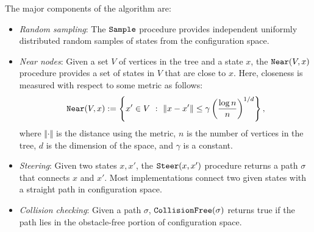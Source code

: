 \documentclass[letterpaper, 10pt, english, conference]{IEEEtran}
\begin{document}
The major components of the algorithm are:
\begin{itemize}
\item {\it Random sampling}:
%
The ${\tt Sample}$ procedure provides independent uniformly distributed random samples of states from the configuration space.

\item {\it Near nodes}:
% 
Given a set $V$ of vertices in the tree and a state $x$, the ${\tt
  Near}(V, x)$ procedure provides a set of states in $V$ that are close to
$x$. Here, closeness is measured with respect to some metric as
follows:
$$
{\tt Near}(V, x) := \left\{ x' \in V \,\,:\,\, \Vert x - x' \Vert \le \gamma
\left(\frac{\log n}{n}\right)^{1/d} \right\},
$$
where $\Vert \cdot \Vert$ is the distance using the metric, $n$ is the number of vertices in the tree, $d$ is the dimension of the space, and $\gamma$ is a constant.
 
\item {\it Steering}:
%
Given two states $x, x'$, the ${\tt Steer}(x,x')$ procedure returns a path $\sigma$ that connects $x$ and $x'$. Most implementations connect two given states with a straight path in configuration space.

\item {\it Collision checking}:
%
Given a path $\sigma$, ${\tt CollisionFree}(\sigma)$ returns true if the path lies in the obstacle-free portion of  configuration space.

\end{itemize}
\end{document}
